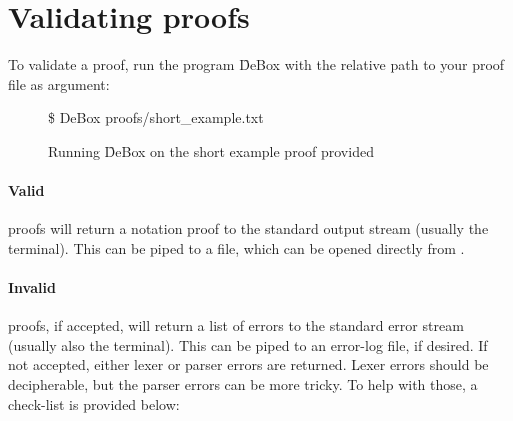 \documentclass[manual.tex]{subfiles}
\begin{document}
\section{Validating proofs}
To validate a proof, run the program \f{DeBox} with the relative
path to your proof file as argument:
\begin{figure}[!ht]
\ttfamily
\$ DeBox proofs/short\_example.txt
\caption{Running \f{DeBox} on the short example proof provided}
\label{ex:short}
\end{figure}

\paragraph{Valid} proofs will return a  notation proof to
the standard output stream (usually the terminal). This can be piped to
a file, which can be opened directly from .

\paragraph{Invalid} proofs, if accepted, will return a list of 
errors to the standard 
error stream (usually also the terminal). This can be piped to an error-log
file, if desired. If not accepted, either lexer or parser errors are
returned. Lexer errors should be decipherable, but the parser errors can
be more tricky. To help with those, a check-list is provided below:
\end{document}

